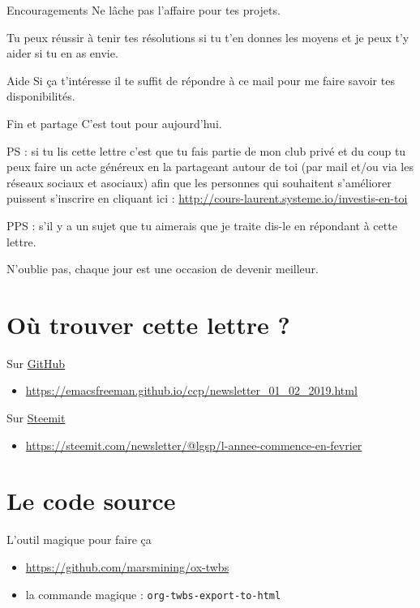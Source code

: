 \documentclass[presentation]{beamer}
\begin{document}
\begin{frame}[label={sec:org787bebc}]{Encouragements}
Ne lâche pas l'affaire pour tes projets. 



Tu peux réussir à tenir tes résolutions si tu t'en donnes les
moyens et je peux t'y aider si tu en as envie. 
\end{frame}




\begin{frame}[label={sec:orgcbda723}]{Aide}
Si ça t'intéresse il te suffit de répondre à ce mail pour me faire
savoir tes disponibilités. 
\end{frame}





\begin{frame}[label={sec:org05b7a47}]{Fin et partage}
C'est tout pour aujourd'hui.



PS : si tu lis cette lettre c'est que tu fais partie de mon club privé
et du coup tu peux faire un acte généreux en la partageant autour de
toi (par mail et/ou via les réseaux sociaux et asociaux) afin que les
personnes qui souhaitent s'améliorer puissent s'inscrire en cliquant
ici : \url{http://cours-laurent.systeme.io/investis-en-toi}


PPS : s'il y a un sujet que tu aimerais que je traite dis-le en
répondant à cette lettre.




N'oublie pas, chaque jour est une occasion de devenir meilleur.
\end{frame}

\section{Où trouver cette lettre ?}
\label{sec:org1137d72}
\begin{frame}[label={sec:org29e31e6}]{Sur \href{https://emacsfreeman.github.io/ccp/newsletter\_01\_02\_2019.html}{GitHub}}
\begin{itemize}
\item \url{https://emacsfreeman.github.io/ccp/newsletter\_01\_02\_2019.html}
\end{itemize}
\end{frame}
\begin{frame}[label={sec:org2f9a14e}]{Sur \href{https://steemit.com/newsletter/@lgsp/l-annee-commence-en-fevrier}{Steemit}}
\begin{itemize}
\item \url{https://steemit.com/newsletter/@lgsp/l-annee-commence-en-fevrier}
\end{itemize}
\end{frame}
\section{Le code source}
\label{sec:org6d69d80}
\begin{frame}[fragile,label={sec:orgd0efcf6}]{L'outil magique pour faire ça}
 \begin{itemize}
\item \url{https://github.com/marsmining/ox-twbs}
\item la commande magique : \texttt{org-twbs-export-to-html}
\end{itemize}
\end{frame}
\end{document}

